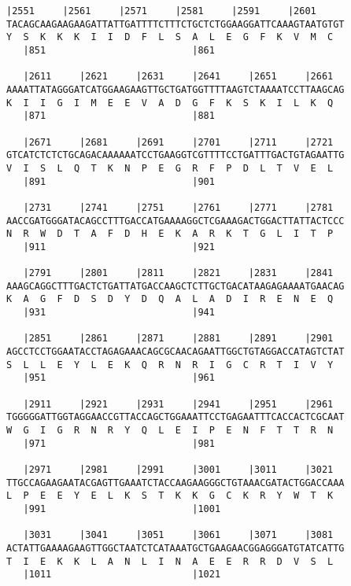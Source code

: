 \documentclass{article}
\begin{document}
\newpage
\begin{Verbatim}[fontfamily=courier]
   |2551     |2561     |2571     |2581     |2591     |2601  
TACAGCAAGAAGAAGATTATTGATTTTCTTTCTGCTCTGGAAGGATTCAAAGTAATGTGT
Y  S  K  K  K  I  I  D  F  L  S  A  L  E  G  F  K  V  M  C  
   |851                          |861                       

   |2611     |2621     |2631     |2641     |2651     |2661  
AAAATTATAGGGATCATGGAAGAAGTTGCTGATGGTTTTAAGTCTAAAATCCTTAAGCAG
K  I  I  G  I  M  E  E  V  A  D  G  F  K  S  K  I  L  K  Q  
   |871                          |881                       

   |2671     |2681     |2691     |2701     |2711     |2721  
GTCATCTCTCTGCAGACAAAAAATCCTGAAGGTCGTTTTCCTGATTTGACTGTAGAATTG
V  I  S  L  Q  T  K  N  P  E  G  R  F  P  D  L  T  V  E  L  
   |891                          |901                       

   |2731     |2741     |2751     |2761     |2771     |2781  
AACCGATGGGATACAGCCTTTGACCATGAAAAGGCTCGAAAGACTGGACTTATTACTCCC
N  R  W  D  T  A  F  D  H  E  K  A  R  K  T  G  L  I  T  P  
   |911                          |921                       

   |2791     |2801     |2811     |2821     |2831     |2841  
AAAGCAGGCTTTGACTCTGATTATGACCAAGCTCTTGCTGACATAAGAGAAAATGAACAG
K  A  G  F  D  S  D  Y  D  Q  A  L  A  D  I  R  E  N  E  Q  
   |931                          |941                       

   |2851     |2861     |2871     |2881     |2891     |2901  
AGCCTCCTGGAATACCTAGAGAAACAGCGCAACAGAATTGGCTGTAGGACCATAGTCTAT
S  L  L  E  Y  L  E  K  Q  R  N  R  I  G  C  R  T  I  V  Y  
   |951                          |961                       

   |2911     |2921     |2931     |2941     |2951     |2961  
TGGGGGATTGGTAGGAACCGTTACCAGCTGGAAATTCCTGAGAATTTCACCACTCGCAAT
W  G  I  G  R  N  R  Y  Q  L  E  I  P  E  N  F  T  T  R  N  
   |971                          |981                       

   |2971     |2981     |2991     |3001     |3011     |3021  
TTGCCAGAAGAATACGAGTTGAAATCTACCAAGAAGGGCTGTAAACGATACTGGACCAAA
L  P  E  E  Y  E  L  K  S  T  K  K  G  C  K  R  Y  W  T  K  
   |991                          |1001                      

   |3031     |3041     |3051     |3061     |3071     |3081  
ACTATTGAAAAGAAGTTGGCTAATCTCATAAATGCTGAAGAACGGAGGGATGTATCATTG
T  I  E  K  K  L  A  N  L  I  N  A  E  E  R  R  D  V  S  L  
   |1011                         |1021                      

\end{Verbatim}
\end{document}
